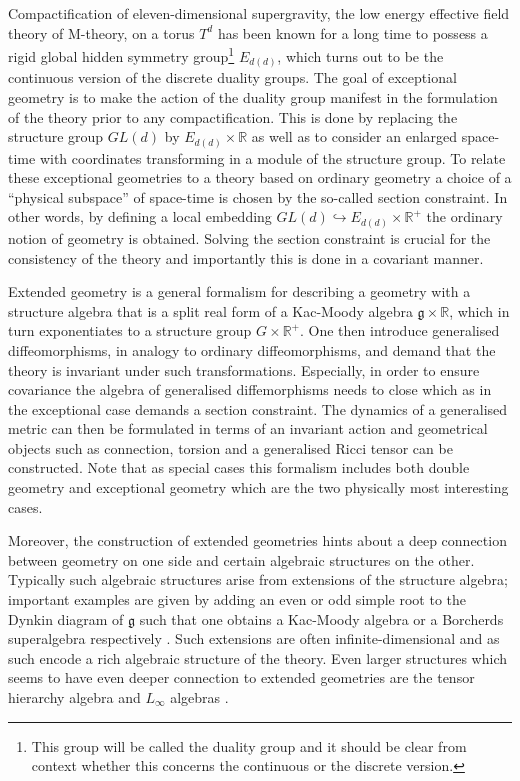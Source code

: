 Compactification of eleven-dimensional supergravity, the low energy effective field theory of M-theory, on a torus $T^d$ has been known for a long time to possess a rigid global hidden symmetry group\footnote{This group will be called the duality group and it should be clear from context whether this concerns the continuous or the discrete version.} $E_{d(d)}$\cite{CREMMER197848,Cremmer:1979up,Cremmer:1997ct}, which turns out to be the continuous version of the discrete duality groups. The goal of exceptional geometry is to make the action of the duality group manifest in the formulation of the theory prior to any compactification. This is done by replacing the structure group $GL(d)$ by $E_{d(d)}\times\mathbb{R}$ as well as to consider an enlarged space-time with coordinates transforming in a module of the structure group. To relate these exceptional geometries to a theory based on ordinary geometry a choice of a ``physical subspace'' of space-time is chosen by the so-called section constraint. In other words, by defining a local embedding $GL(d)\hookrightarrow E_{d(d)}\times\mathbb{R}^+$ the ordinary notion of geometry is obtained. Solving the section constraint is crucial for the consistency of the theory and importantly this is done in a covariant manner. 

Extended geometry \cite{CederwallPalmkvist2017} is a general formalism for describing a geometry with a structure algebra that is a split real form of a Kac-Moody algebra $\mathfrak{g}\times\mathbb{R}$, which in turn exponentiates to a structure group $G\times \mathbb{R}^+$. One then introduce generalised diffeomorphisms, in analogy to ordinary diffeomorphisms, and demand that the theory is invariant under such transformations. Especially, in order to ensure covariance the algebra of generalised diffemorphisms needs to close which as in the exceptional case demands a section constraint. The dynamics of a generalised metric can then be formulated in terms of an invariant action and geometrical objects such as connection, torsion and a generalised Ricci tensor can be constructed. Note that as special cases this formalism includes both double geometry and exceptional geometry which are the two physically most interesting cases.


Moreover, the construction of extended geometries hints about a deep connection between geometry on one side and certain algebraic structures on the other. Typically such algebraic structures arise from extensions of the structure algebra; important examples are given by adding an even or odd simple root to the Dynkin diagram of $\mathfrak{g}$ such that one obtains a Kac-Moody algebra or a Borcherds superalgebra respectively \cite{Palmkvist2015ExpGeomSuperAlg,CederwallPalmkvistSuperalgebras2015}. Such extensions are often infinite-dimensional and as such encode a rich algebraic structure of the theory. Even larger structures which seems to have even deeper connection to extended geometries are the tensor hierarchy algebra \cite{Palmkvist:2013vya,Carbone:2018njd} and $L_\infty$ algebras \cite{Cederwall:2018aab,Hohm:2017pnh}.


